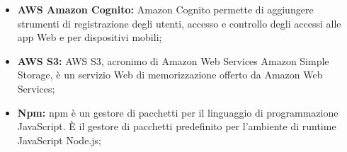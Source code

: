 \begin{itemize}
    \item \textbf{AWS Amazon Cognito:} Amazon Cognito permette di aggiungere strumenti di registrazione degli utenti, accesso e controllo degli accessi alle app Web e per dispositivi mobili;
    \item \textbf{AWS S3:} AWS S3, acronimo di Amazon Web Services Amazon Simple Storage, è un servizio Web di mem\textbf{}orizzazione offerto da Amazon Web Services;
    \item \textbf{Npm:} npm è un gestore di pacchetti per il linguaggio di programmazione JavaScript. È il gestore di pacchetti predefinito per l'ambiente di runtime JavaScript Node.js;
\end{itemize}
